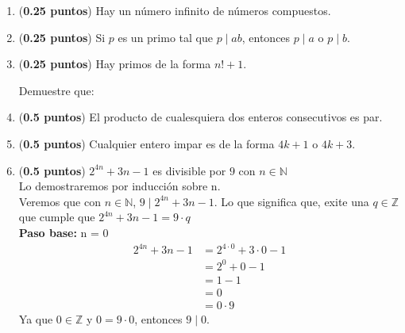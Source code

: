 \documentclass[fontsize=12pt]{scrartcl}
\begin{document}
\begin{enumerate}
                
		\item ({\bf 0.25 puntos})
		Hay un n\'umero infinito de n\'umeros compuestos.
		
		\item ({\bf 0.25 puntos})
		Si $ p $ es un primo tal que $ p \mid ab $, entonces $ p \mid  a $ 
		o $ p \mid b $.
		
		\item ({\bf 0.25 puntos})
		Hay primos de la forma $n! + 1 $.
		
	
	Demuestre que:
				
		\item ({\bf 0.5 puntos})
		El producto de cualesquiera dos enteros consecutivos es par.
		
		\item ({\bf 0.5 puntos})
		Cualquier entero impar es de la forma $4k + 1$ o $4k + 3$.

		\item ({\bf 0.5 puntos}) 
	          $2^{4n} + 3n - 1$ es divisible por $9$  con $n \in \mathbb{N}$ \\
                  Lo demostraremos por inducción sobre n. \\
                  Veremos que con $n \in \mathbb{N}$, $9 \mid 2^{4n} + 3n - 1$. Lo que significa que, exite una $q \in \mathbb{Z} $ que cumple que $2^{4n} + 3n - 1 = 9 \cdot q$ \\
                  \textbf {Paso base:} n = 0 \\
                   \begin{equation*}
                  \begin{split}
                    2^{4n} + 3n - 1 &= 2^{4\cdot 0} + 3 \cdot 0 - 1 \\
                    &= 2^{0} + 0 - 1 \\
                    &= 1 -1 \\
                    &= 0 \\
                    &= 0 \cdot 9
                  \end{split}
                   \end{equation*}
                   Ya que $0 \in \mathbb{Z}$ y $0 = 9 \cdot 0$, entonces $9 \mid 0$.


\end{enumerate}
\end{document}
